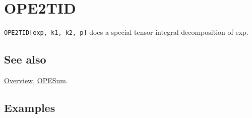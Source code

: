 \documentclass[../FeynCalcManual.tex]{subfiles}
\begin{document}
\hypertarget{ope2tid}{
\section{OPE2TID}\label{ope2tid}}

\texttt{OPE2TID[\allowbreak{}exp,\ \allowbreak{}k1,\ \allowbreak{}k2,\ \allowbreak{}p]}
does a special tensor integral decomposition of exp.

\subsection{See also}

\hyperlink{toc}{Overview}, \hyperlink{opesum}{OPESum}.

\subsection{Examples}
\end{document}
